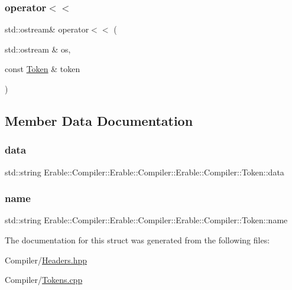 \subsubsection{\texorpdfstring{operator$<$$<$}{operator<<}}
{\footnotesize\ttfamily std\+::ostream\& operator$<$$<$ (\begin{DoxyParamCaption}\item[{std\+::ostream \&}]{os,  }\item[{const \mbox{\hyperlink{struct_erable_1_1_compiler_1_1_erable_1_1_compiler_1_1_erable_1_1_compiler_1_1_token}{Token}} \&}]{token }\end{DoxyParamCaption})\hspace{0.3cm}{\ttfamily [friend]}}



\subsection{Member Data Documentation}
\mbox{\label{struct_erable_1_1_compiler_1_1_erable_1_1_compiler_1_1_erable_1_1_compiler_1_1_token_a2242aa04fed42f2f36f6a6b11daf5fb3}} 
\subsubsection{\texorpdfstring{data}{data}}
{\footnotesize\ttfamily std\+::string Erable\+::\+Compiler\+::\+Erable\+::\+Compiler\+::\+Erable\+::\+Compiler\+::\+Token\+::data}

\mbox{\label{struct_erable_1_1_compiler_1_1_erable_1_1_compiler_1_1_erable_1_1_compiler_1_1_token_a0e08ccf5ccfcba6403d678017aa013a5}} 
\subsubsection{\texorpdfstring{name}{name}}
{\footnotesize\ttfamily std\+::string Erable\+::\+Compiler\+::\+Erable\+::\+Compiler\+::\+Erable\+::\+Compiler\+::\+Token\+::name}



The documentation for this struct was generated from the following files\+:\begin{DoxyCompactItemize}
\item 
Compiler/\mbox{\hyperlink{_headers_8hpp}{Headers.\+hpp}}\item 
Compiler/\mbox{\hyperlink{_tokens_8cpp}{Tokens.\+cpp}}\end{DoxyCompactItemize}
